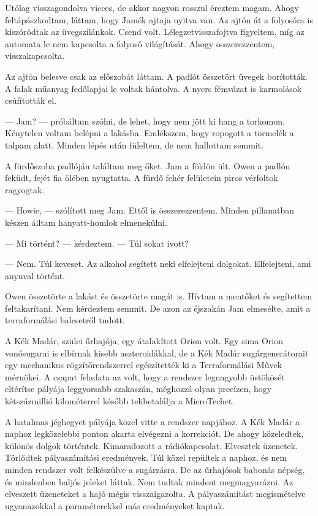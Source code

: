 \documentclass[10pt]{memoir}
\begin{document}
Utólag visszagondolva vicces, de akkor nagyon rosszul éreztem magam. Ahogy
feltápászkodtam, láttam, hogy Jamék ajtaja nyitva van. Az ajtón át a folyosóra
is kiszóródtak az üvegszilánkok. Csend volt. Lélegzetvisszafojtva figyeltem,
míg az automata le nem kapcsolta a folyosó világítását. Ahogy összerezzentem,
visszakapcsolta.

Az ajtón belesve csak az előszobát láttam. A padlót összetört üvegek
borították. A falak műanyag fedőlapjai le voltak hántolva. A nyers fémvázat is
karmolások csúfították el.

--- Jam? --- próbáltam szólni, de lehet, hogy nem jött ki hang a torkomon.
Kénytelen voltam belépni a lakásba. Emlékszem, hogy ropogott a törmelék a
talpam alatt. Minden lépés után füleltem, de nem hallottam semmit.

A fürdőszoba padlóján találtam meg őket. Jam a földön ült. Owen a padlón
feküdt, fejét fia ölében nyugtatta. A fürdő fehér felületein piros vérfoltok
ragyogtak.

--- Howie, --- szólított meg Jam. Ettől is összerezzentem. Minden pillanatban
készen álltam hanyatt-homlok elmenekülni.

--- Mi történt? --- kérdeztem. --- Túl sokat ivott?

--- Nem. Túl keveset. Az alkohol segített neki elfelejteni dolgokat.
Elfelejteni, ami anyuval történt.

Owen összetörte a lakást és összetörte magát is. Hívtam a mentőket és
segítettem feltakarítani. Nem kérdeztem semmit. De azon az éjszakán Jam
elmesélte, amit a terraformálási balesetről tudott.

A Kék Madár, szülei űrhajója, egy átalakított Orion volt. Egy sima Orion
vonósugarai is elbírnak kisebb aszteroidákkal, de a Kék Madár sugárgenerátorait
egy mechanikus rögzítőrendszerrel egészítették ki a Terraformálási Művek
mérnökei. A csapat feladata az volt, hogy a rendszer legnagyobb üstökösét
eltérítse pályája leggyorsabb szakaszán, méghozzá olyan precízen, hogy
kétszázmillió kilométerrel később telibetalálja a MicroTechet.

A hatalmas jéghegyet pályája közel vitte a rendszer napjához. A Kék Madár a
naphoz legközelebbi ponton akarta elvégezni a korrekciót. De ahogy közeledtek,
különös dolgok történtek. Kimaradozott a rádiókapcsolat. Elvesztek üzenetek.
Törlődtek pályaszámítási eredmények. Túl közel repültek a naphoz, és nem minden
rendszer volt felkészülve a sugárzásra. De az űrhajósok babonás népség, és
mindenben baljós jeleket láttak. Nem tudtak mindent megmagyarázni. Az elveszett
üzeneteket a hajó mégis visszaigazolta. A pályaszámítást megismételve
ugyanazokkal a paraméterekkel más eredményeket kaptak.
\end{document}
